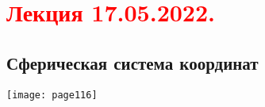 \documentclass[main.tex]{subfiles}
\begin{document}
\section{\textcolor{red}{Лекция 17.05.2022.}}

\subsection{Сферическая система координат}
\texttt{[image: page116]}



\end{document}

